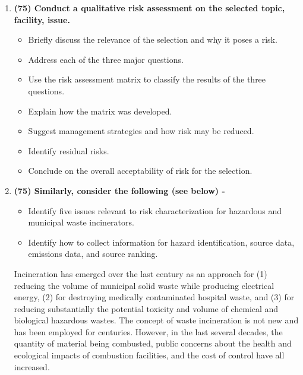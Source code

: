 \documentclass[11pt,a4paper]{article}
\begin{document}
\begin{enumerate}[leftmargin=*,topsep=0pt,font=\bfseries]
    \item\textbf{(75) Conduct a qualitative risk assessment on the selected topic, facility, issue.}
        \begin{itemize}[topsep=-1ex,itemsep=-1ex,partopsep=1ex,parsep=1ex,font=\bfseries]
            \item Briefly discuss the relevance of the selection and why it poses a risk.
            \item Address each of the three major questions.
            \item Use the risk assessment matrix to classify the results of the three questions.
            \item Explain how the matrix was developed.
            \item Suggest management strategies and how risk may be reduced.
            \item Identify residual risks.
            \item Conclude on the overall acceptability of risk for the selection.
        \end{itemize}
        \vspace{\baselineskip}
    
        
        
        
        
        
        
        
        
        
        
        
        
        
        \newpage
    \item\textbf{(75) Similarly, consider the following (see below) - }
        \begin{itemize}[topsep=-1ex,itemsep=-1ex,partopsep=1ex,parsep=1ex,font=\bfseries]
            \item Identify five issues relevant to risk characterization for hazardous and municipal waste incinerators.
            \item Identify how to collect information for hazard identification, source data, emissions data, and source ranking.
        \end{itemize}
        \vspace{0.10in}
        Incineration has emerged over the last century as an approach for (1) reducing the volume of municipal solid waste while producing electrical energy, (2) for destroying medically contaminated hospital waste, and (3) for reducing substantially the potential toxicity and volume of chemical and biological hazardous wastes. The concept of waste incineration is not new and has been employed for centuries. However, in the last several decades, the quantity of material being combusted, public concerns about the health and ecological impacts of combustion facilities, and the cost of control have all increased.


\end{enumerate}
\end{document}
